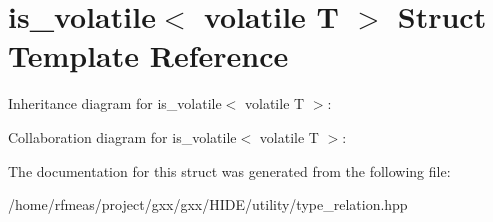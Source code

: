 \hypertarget{structis__volatile_3_01volatile_01T_01_4}{}\section{is\+\_\+volatile$<$ volatile T $>$ Struct Template Reference}
\label{structis__volatile_3_01volatile_01T_01_4}


Inheritance diagram for is\+\_\+volatile$<$ volatile T $>$\+:


Collaboration diagram for is\+\_\+volatile$<$ volatile T $>$\+:


The documentation for this struct was generated from the following file\+:\begin{DoxyCompactItemize}
\item 
/home/rfmeas/project/gxx/gxx/\+H\+I\+D\+E/utility/type\+\_\+relation.\+hpp\end{DoxyCompactItemize}
